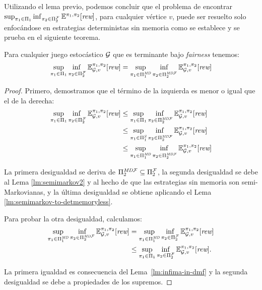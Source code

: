 Utilizando el lema previo, podemos concluir que el problema de encontrar $\sup_{\pi_{1} \in \Pi_{1}} \inf_{\pi_{2} \in \Pi^{\mathcal{F}}_{2}} \mathbb{E}^{\pi_{1}, \pi_{2}}[\textit{rew}]$, para cualquier vértice $v$, puede ser resuelto solo enfocándose en estrategias deterministas sin memoria como se establece y se prueba en el siguiente teorema.
%
\begin{theorem}\label{thm:reduce-to-memoryless}
  Para cualquier juego estocástico $\mathcal{G}$  que es terminante bajo \textit{fairness} tenemos:
  \[
  \adjustlimits \sup_{\strat{1} \in \Strategies{1}} \inf_{\strat{2} \in \FairStrats{2}} \Expect{\strat{1}}{\strat{2}}_{\StochG,v}[\Rewards]
  =
  \adjustlimits \sup_{\strat{1} \in \DetMemorylessStrats{1}} \inf_{\strat{2} \in \DetMemorylessFairStrats{2}} \Expect{\strat{1}}{\strat{2}}_{\StochG,v}[\Rewards]
 \]
\end{theorem}
%
\begin{proof}
	Primero, demostramos que el término de la izquierda es menor o igual que el de la derecha:
\begin{align*}
  \adjustlimits \sup_{\strat{1} \in \Strategies{1}} \inf_{\strat{2} \in \FairStrats{2}} \Expect{\strat{1}}{\strat{2}}_{\StochG,v}[\Rewards]
  &{} \leq  \adjustlimits \sup_{\strat{1} \in \Strategies{1}} \inf_{\strat{2} \in \DetMemorylessFairStrats{2}} \Expect{\strat{1}}{\strat{2}}_{\StochG,v}[\Rewards]\\
  &{} \leq \adjustlimits  \sup_{\strat{1} \in \SemiMarkovStrats{1}} \inf_{\strat{2} \in \DetMemorylessFairStrats{2}} \Expect{\strat{1}}{\strat{2}}_{\StochG,v}[\Rewards]\\
  &{} \leq \adjustlimits \sup_{\strat{1} \in \DetMemorylessStrats{1}} \inf_{\strat{2} \in \DetMemorylessFairStrats{2}} \Expect{\strat{1}}{\strat{2}}_{\StochG,v}[\Rewards]
\end{align*}

La primera desigualdad se deriva de $\Pi^{\textit{MD}\mathcal{F}}_{2} \subseteq \Pi^{\mathcal{F}}_{2}$, la segunda desigualdad se debe al Lema \ref{lm:semimarkov2} y al hecho de que las estrategias sin memoria son semi-Markovianas, y la última desigualdad se obtiene aplicando el Lema \ref{lm:semimarkov-to-detmemoryless}.

Para probar la otra desigualdad, calculamos:
%
 \begin{align*}
  \sup_{\pi_{1} \in \Pi^{\textit{MD}}_{1}} \inf_{\pi_{2} \in \Pi^{\textit{MD}\mathcal{F}}_{2}} \mathbb{E}^{\pi_{1}, \pi_{2}}_{\mathcal{G},v}[\textit{rew}]
 & {} = \sup_{\pi_{1} \in \Pi^{\textit{MD}}_{1}} \inf_{\pi_{2} \in \Pi^{\mathcal{F}}_{2}} \mathbb{E}^{\pi_{1}, \pi_{2}}_{\mathcal{G},v}[\textit{rew}] \\
 & {} \leq \sup_{\pi_{1} \in \Pi_{1}} \inf_{\pi_{2} \in \Pi^{\mathcal{F}}_{2}} \mathbb{E}^{\pi_{1}, \pi_{2}}_{\mathcal{G},v}[\textit{rew}].
 \end{align*}

%
  La primera igualdad es consecuencia del Lema~\ref{lm:infima-in-dmf} y la segunda desigualdad se debe a propiedades de los supremos.
\qedhere
\end{proof}





